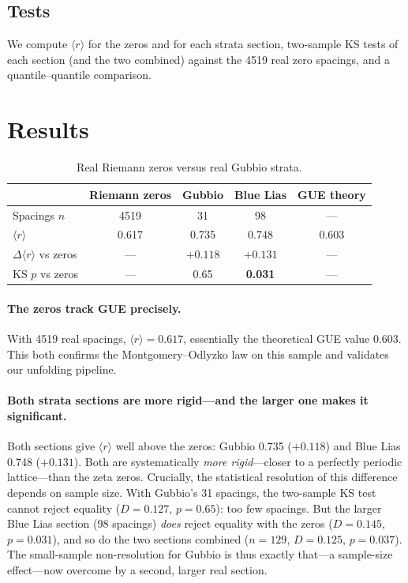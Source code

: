 \documentclass[12pt,a4paper]{article}
\begin{document}
\subsection{Tests}
We compute $\langle r\rangle$ for the zeros and for each strata section, two-sample KS tests of each section (and the two combined) against the 4519 real zero spacings, and a quantile--quantile comparison.

\section{Results}

\begin{table}[H]
\centering
\caption{Real Riemann zeros versus real Gubbio strata.}
\label{tab:main}
\small
\begin{tabular}{lcccc}
\toprule
 & Riemann zeros & Gubbio & Blue Lias & GUE theory \\
\midrule
Spacings $n$ & 4519 & 31 & 98 & --- \\
$\langle r\rangle$ & 0.617 & 0.735 & 0.748 & 0.603 \\
$\Delta\langle r\rangle$ vs zeros & --- & $+0.118$ & $+0.131$ & --- \\
KS $p$ vs zeros & --- & 0.65 & \textbf{0.031} & --- \\
\bottomrule
\end{tabular}
\end{table}

\paragraph{The zeros track GUE precisely.} With 4519 real spacings, $\langle r\rangle = 0.617$, essentially the theoretical GUE value 0.603. This both confirms the Montgomery--Odlyzko law on this sample and validates our unfolding pipeline.

\paragraph{Both strata sections are more rigid---and the larger one makes it significant.} Both sections give $\langle r\rangle$ well above the zeros: Gubbio 0.735 ($+0.118$) and Blue Lias 0.748 ($+0.131$). Both are systematically \emph{more rigid}---closer to a perfectly periodic lattice---than the zeta zeros. Crucially, the statistical resolution of this difference depends on sample size. With Gubbio's 31 spacings, the two-sample KS test cannot reject equality ($D=0.127$, $p=0.65$): too few spacings. But the larger Blue Lias section (98 spacings) \emph{does} reject equality with the zeros ($D=0.145$, $p=0.031$), and so do the two sections combined ($n=129$, $D=0.125$, $p=0.037$). The small-sample non-resolution for Gubbio is thus exactly that---a sample-size effect---now overcome by a second, larger real section.
\end{document}

